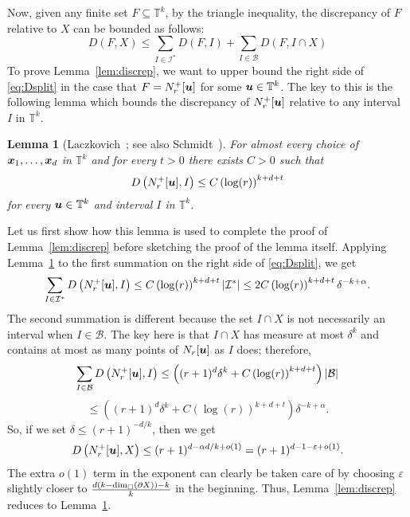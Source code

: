 \documentclass[12pt,a4paper]{amsart}
\numberwithin{equation}{section}
\newtheorem{lemma}[equation]{Lemma}
\theoremstyle{definition}
\begin{document}
Now, given any finite set $F\subseteq\mathbb{T}^k$, by the triangle inequality, the discrepancy of $F$ relative to $X$ can be bounded as follows:
\begin{equation}\label{eq:Dsplit}D(F,X)\leq \sum_{I\in \mathcal{I}^*}D(F,I) + \sum_{I\in \mathcal{B}}D(F,I\cap X)\end{equation}
To prove Lemma~\ref{lem:discrep}, we want to upper bound the right side of \eqref{eq:Dsplit} in the case that $F=N_r^+[\boldsymbol{u}]$ for some $\boldsymbol{u}\in\mathbb{T}^k$. The key to this is the following lemma which bounds the discrepancy of $N_r^+[\boldsymbol{u}]$ relative to any interval $I$ in $\mathbb{T}^k$.

\begin{lemma}[Laczkovich~{\cite[Lemma~2]{Laczkovich92b}}; see also Schmidt~{\cite[p.~517]{Schmidt64}}]
\label{lem:intervalLog}
For almost every choice of $\boldsymbol{x}_1,\dots,\boldsymbol{x}_d$ in $\mathbb{T}^k$ and for every $t>0$ there exists $C>0$ such that
\[D\left(N_r^+[\boldsymbol{u}], I\right)\leq C\left(\log(r)\right)^{k+d+t}\]
for every $\boldsymbol{u}\in\mathbb{T}^k$ and interval $I$ in $\mathbb{T}^k$. 
\end{lemma}

Let us first show how this lemma is used to complete the proof of Lemma~\ref{lem:discrep} before sketching the proof of the lemma itself.  Applying Lemma~\ref{lem:intervalLog} to the first summation on the right side of \eqref{eq:Dsplit}, we get 
\[\sum_{I\in \mathcal{I}^*}D\left(N_r^+[\boldsymbol{u}], I\right)\leq C\left(\log(r)\right)^{k+d+t}|\mathcal{I}^*| \leq 2C\left(\log(r)\right)^{k+d+t}\delta^{-k+\alpha}.\]
The second summation is different because the set $I\cap X$ is not necessarily an interval when $I\in \mathcal{B}$. The key here is that $I\cap X$ has measure at most $\delta^k$ and contains at most as many points of $N_r[\boldsymbol{u}]$ as $I$ does; therefore,
\[\sum_{I\in\mathcal{B}} D\left(N_r^+[\boldsymbol{u}], I\right)\leq \left((r+1)^d\delta^k + C\left(\log(r)\right)^{k+d+t}\right)|\mathcal{B}|\]
\[\leq \left((r+1)^d\delta^k + C\left(\log(r)\right)^{k+d+t}\right)\delta^{-k+\alpha}.\]
So, if we set $\delta\leq  (r+1)^{-d/k}$, then we get
\[D\left(N_r^+[\boldsymbol{u}],X\right)\leq (r+1)^{d-\alpha d/k+o(1)} = (r+1)^{d-1-\varepsilon+o(1)}.\]
The extra $o(1)$ term in the exponent can clearly be taken care of by choosing $\varepsilon$ slightly closer to $\frac{d(k-\operatorname{dim}_\square(\partial X))-k}{k}$ in the beginning. Thus, Lemma~\ref{lem:discrep} reduces to Lemma~\ref{lem:intervalLog}.
\end{document}
